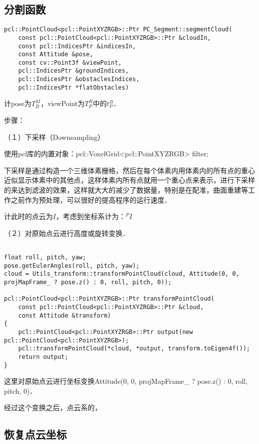 \documentclass[UTF8]{ctexart}
\begin{document}
\subsection{分割函数}

\begin{lstlisting}[caption={}]
pcl::PointCloud<pcl::PointXYZRGB>::Ptr PC_Segment::segmentCloud(
	const pcl::PointCloud<pcl::PointXYZRGB>::Ptr &cloudIn,
	const pcl::IndicesPtr &indicesIn,
	const Attitude &pose,
	const cv::Point3f &viewPoint,
	pcl::IndicesPtr &groundIndices,
	pcl::IndicesPtr &obstaclesIndices,
	pcl::IndicesPtr *flatObstacles)
\end{lstlisting}

计pose为$T^M_B$，viewPoint为$T^B_P$中的$t^B_P$．

步骤：

（１）下采样（Downsampling）

使用pcl库的内置对象：pcl::VoxelGrid<pcl::PointXYZRGB> filter;

下采样是通过构造一个三维体素栅格，然后在每个体素内用体素内的所有点的重心近似显示体素中的其他点，这样体素内所有点就用一个重心点来表示，进行下采样的来达到滤波的效果，这样就大大的减少了数据量，特别是在配准，曲面重建等工作之前作为预处理，可以很好的提高程序的运行速度．

计此时的点云为$I$，考虑到坐标系计为：${^P}I$

（２）对原始点云进行高度或旋转变换．

\begin{lstlisting}[caption={}]

float roll, pitch, yaw;
pose.getEulerAngles(roll, pitch, yaw);
cloud = Utils_transform::transformPointCloud(cloud, Attitude(0, 0, projMapFrame_ ? pose.z() : 0, roll, pitch, 0));

pcl::PointCloud<pcl::PointXYZRGB>::Ptr transformPointCloud(
    const pcl::PointCloud<pcl::PointXYZRGB>::Ptr &cloud,
    const Attitude &transform)
{
    pcl::PointCloud<pcl::PointXYZRGB>::Ptr output(new pcl::PointCloud<pcl::PointXYZRGB>);
    pcl::transformPointCloud(*cloud, *output, transform.toEigen4f());
    return output;
}
\end{lstlisting}

这里对原始点云进行坐标变换Attitude(0, 0, projMapFrame_ ? pose.z() : 0, roll, pitch, 0)．

经过这个变换之后，点云系的，

\subsection{恢复点云坐标}
\end{document}
